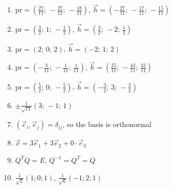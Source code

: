 \begin{enumerate}[label=\arabic*., leftmargin=*, itemsep=1pt]
\item $\mathrm{pr}=(\frac{27}{11};\,-\frac{27}{11};\,-\frac{18}{11})$, $\vec h=(-\frac{27}{11};\,-\frac{17}{11};\,-\frac{15}{11})$
\item $\mathrm{pr}=(\frac{3}{2};\,1;\,-\frac{1}{2})$, $\vec h=(\frac{3}{2};\,-2;\,\frac{1}{2})$
\item $\mathrm{pr}=(2;\,0;\,2)$, $\vec h=(-2;\,1;\,2)$
\item $\mathrm{pr}=(-\frac{3}{11};\,-\frac{1}{11};\,\frac{1}{11})$, $\vec h=(\frac{25}{11};\,-\frac{43}{11};\,\frac{32}{11})$
\item $\mathrm{pr}=(\frac{5}{2};\,0;\,-\frac{5}{2})$, $\vec h=(-\frac{3}{2};\,3;\,-\frac{3}{2})$
\item $\pm\frac{1}{\sqrt{11}}(3;\,-1;\,1)$
\item $(\vec e_i,\vec e_j)=\delta_{ij}$, so the basis is orthonormal
\item $\vec x=3\vec e_1+3\vec e_2+0\cdot\vec e_3$
\item $Q^TQ=E$, $Q^{-1}=Q^T=Q$
\item $\frac{1}{\sqrt2}(1;0;1)$, $\frac{1}{\sqrt6}(-1;2;1)$
\end{enumerate}

